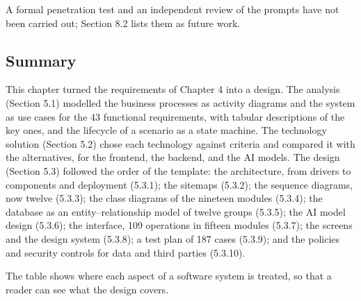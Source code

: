 A formal penetration test and an independent review of the prompts have not been carried out; Section 8.2 lists them as future work.

\subsection{Summary}

This chapter turned the requirements of Chapter 4 into a design. The analysis (Section 5.1) modelled the business processes as activity diagrams and the system as use cases for the 43 functional requirements, with tabular descriptions of the key ones, and the lifecycle of a scenario as a state machine. The technology solution (Section 5.2) chose each technology against criteria and compared it with the alternatives, for the frontend, the backend, and the AI models. The design (Section 5.3) followed the order of the template: the architecture, from drivers to components and deployment (5.3.1); the sitemaps (5.3.2); the sequence diagrams, now twelve (5.3.3); the class diagrams of the nineteen modules (5.3.4); the database as an entity--relationship model of twelve groups (5.3.5); the AI model design (5.3.6); the interface, 109 operations in fifteen modules (5.3.7); the screens and the design system (5.3.8); a test plan of 187 cases (5.3.9); and the policies and security controls for data and third parties (5.3.10).

The table shows where each aspect of a software system is treated, so that a reader can see what the design covers.


